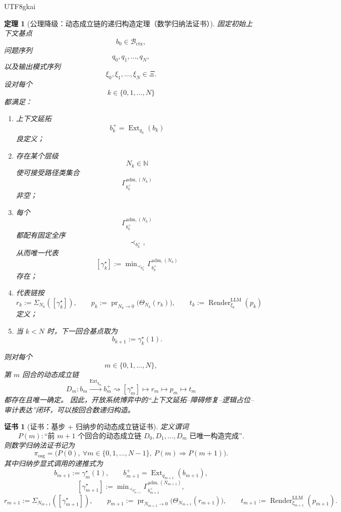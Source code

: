 \documentclass[12pt]{article}
\newtheorem{theorem}{定理}[section]
\newtheorem{Certificate}{证书}[section]
\newcommand{\NN}{\mathbb{N}}
\newcommand{\Render}{\operatorname{Render}}
\begin{document}
\begin{CJK*}{UTF8}{gkai}
\begin{theorem}[公理降级：动态成立链的递归构造定理（数学归纳法证书）]
\label{thm:tex37-ch19-dynamic-chain}
固定初始上下文基点
\[
  b_0\in \mathcal{B}_{\mathrm{ctx}},
\]
问题序列
\[
  q_0,q_1,\dots,q_N,
\]
以及输出模式序列
\[
  \xi_0,\xi_1,\dots,\xi_N\in \Xi.
\]
设对每个
\[
  k\in\{0,1,\dots,N\}
\]
都满足：
\begin{enumerate}
  \item 上下文延拓
  \[
    b_k^+=\operatorname{Ext}_{q_k}(b_k)
  \]
  良定义；
  \item 存在某个层级
  \[
    N_k\in\NN
  \]
  使可接受路径类集合
  \[
    \Gamma_{b_k^+}^{\mathrm{adm},(N_k)}
  \]
  非空；
  \item 每个
  \[
    \Gamma_{b_k^+}^{\mathrm{adm},(N_k)}
  \]
  都配有固定全序
  \[
    \prec_{b_k^+},
  \]
  从而唯一代表
  \[
    [\gamma_k^\star]
    :=
    \min\nolimits_{\prec_{b_k^+}}
    \Gamma_{b_k^+}^{\mathrm{adm},(N_k)}
  \]
  存在；
  \item 代表链按
  \[
    r_k:=\Sigma_{N_k}([\gamma_k^\star]),
    \qquad
    p_k:=\operatorname{pr}_{N_k\to 0}\bigl(\Theta_{N_k}(r_k)\bigr),
    \qquad
    t_k:=\Render^{\mathrm{LLM}}_{\xi_k}(p_k)
  \]
  定义；
  \item 当 $k<N$ 时，下一回合基点取为
  \[
    b_{k+1}:=\gamma_k^\star(1).
  \]
\end{enumerate}
则对每个
\[
  m\in\{0,1,\dots,N\},
\]
第 $m$ 回合的动态成立链
\[
  D_m:
  b_m
  \xrightarrow{\operatorname{Ext}_{q_m}}
  b_m^+
  \rightsquigarrow
  [\gamma_m^\star]
  \mapsto
  r_m
  \mapsto
  p_m
  \mapsto
  t_m
\]
都存在且唯一确定。
因此，开放系统博弈中的“上下文延拓--障碍修复--逻辑占位--审计表达”闭环，可以按回合数递归构造。
\end{theorem}

\begin{Certificate}[证书：基步 + 归纳步的动态成立链证书]
\label{cert:tex37-ch19-dynamic-chain}
定义谓词
\[
  P(m):
  \text{“前 $m+1$ 个回合的动态成立链 }
  D_0,D_1,\dots,D_m
  \text{ 已唯一构造完成”}.
\]
则数学归纳法证书记为
\[
  \pi_{\mathrm{osg}}
  =
  \bigl(
    P(0),\
    \forall m\in\{0,1,\dots,N-1\},\ P(m)\Rightarrow P(m+1)
  \bigr).
\]
其中归纳步显式调用的递推式为
\[
  b_{m+1}:=\gamma_m^\star(1),
  \qquad
  b_{m+1}^+=\operatorname{Ext}_{q_{m+1}}(b_{m+1}),
\]
\[
  [\gamma_{m+1}^\star]
  :=
  \min\nolimits_{\prec_{b_{m+1}^+}}
  \Gamma_{b_{m+1}^+}^{\mathrm{adm},(N_{m+1})},
\]
\[
  r_{m+1}:=\Sigma_{N_{m+1}}([\gamma_{m+1}^\star]),
  \qquad
  p_{m+1}:=\operatorname{pr}_{N_{m+1}\to 0}\bigl(\Theta_{N_{m+1}}(r_{m+1})\bigr),
  \qquad
  t_{m+1}:=\Render^{\mathrm{LLM}}_{\xi_{m+1}}(p_{m+1}).
\]
\end{Certificate}


\end{CJK*}
\end{document}
